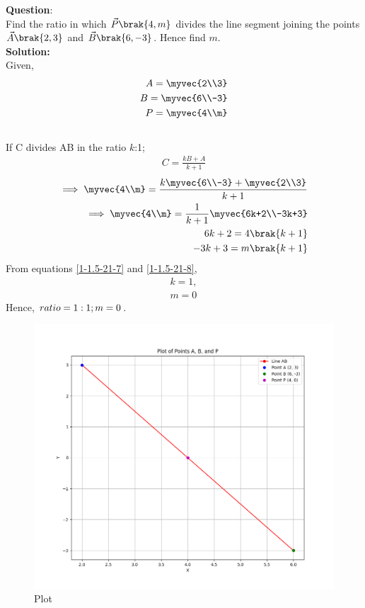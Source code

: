 \documentclass[journal]{IEEEtran}
\begin{document}
\textbf{Question}:\\
Find the ratio in which $\vec{P}\brak{4,m}$ divides the line segment joining the points $\vec{A}\brak{2,3}$ and $\vec{B}\brak{6,-3}$. Hence find $m$.
\\
\textbf{Solution: }\\
Given, \begin{align}
    A=\myvec{2\\3}\label{1-1.5-21-1}\\
    B=\myvec{6\\-3}\label{1-1.5-21-2}\\
    P=\myvec{4\\m}\label{1-1.5-21-3}
\end{align}
\\
If C divides AB in the ratio $k$:1; 
\begin{align}
C= \frac{kB+A}{k+1}\label{1-1.5-21-4}
\end{align}
\begin{align}
\implies \myvec{4\\m}=\frac{k\myvec{6\\-3}+\myvec{2\\3}}{k+1}\label{1-1.5-21-5}\\
\implies \myvec{4\\m}=\frac{1}{k+1}\myvec{6k+2\\-3k+3}\label{1-1.5-21-6}\\
6k+2=4\brak{k+1}\label{1-1.5-21-7}\\
-3k+3=m\brak{k+1}\label{1-1.5-21-8}
\end{align}
   From equations \eqref{1-1.5-21-7} and \eqref{1-1.5-21-8}, 
\begin{align}
k=1,\\
m=0
\end{align}
Hence, $ratio=1:1;\\
m=0$.
\begin{figure}[h!]
   \centering
   \includegraphics[width=1\linewidth]{fig/Figure_1.png}
   \caption{Plot}
   \label{stemplot}
\end{figure}
\end{document}
